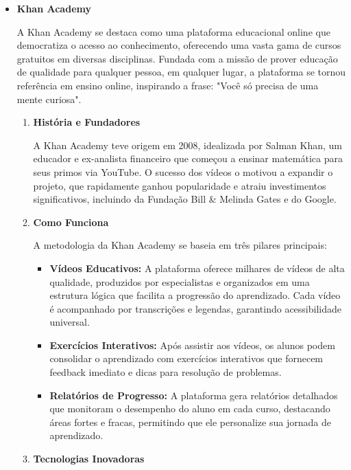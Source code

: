     


    \begin{itemize}
    \item \textbf{Khan Academy}

    A Khan Academy se destaca como uma plataforma educacional online que democratiza o acesso ao conhecimento, oferecendo uma vasta gama de cursos gratuitos em diversas disciplinas. Fundada com a missão de prover educação de qualidade para qualquer pessoa, em qualquer lugar, a plataforma se tornou referência em ensino online, inspirando a frase: "Você só precisa de uma mente curiosa".

    \begin{enumerate}
        \item \textbf{História e Fundadores}
        
        A Khan Academy teve origem em 2008, idealizada por Salman Khan, um educador e ex-analista financeiro que começou a ensinar matemática para seus primos via YouTube. O sucesso dos vídeos o motivou a expandir o projeto, que rapidamente ganhou popularidade e atraiu investimentos significativos, incluindo da Fundação Bill & Melinda Gates e do Google.

        \item \textbf{Como Funciona}
        
        A metodologia da Khan Academy se baseia em três pilares principais:

        \begin{itemize}
            \item \textbf{Vídeos Educativos:} A plataforma oferece milhares de vídeos de alta qualidade, produzidos por especialistas e organizados em uma estrutura lógica que facilita a progressão do aprendizado. Cada vídeo é acompanhado por transcrições e legendas, garantindo acessibilidade universal.
            \item \textbf{Exercícios Interativos:} Após assistir aos vídeos, os alunos podem consolidar o aprendizado com exercícios interativos que fornecem feedback imediato e dicas para resolução de problemas.
            \item \textbf{Relatórios de Progresso:} A plataforma gera relatórios detalhados que monitoram o desempenho do aluno em cada curso, destacando áreas fortes e fracas, permitindo que ele personalize sua jornada de aprendizado.
        \end{itemize}

        \item \textbf{Tecnologias Inovadoras}
        

\end{enumerate}
\end{itemize}
